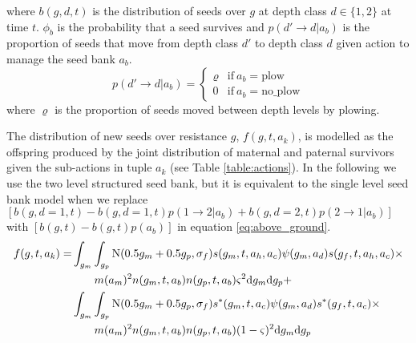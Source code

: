 \documentclass[12pt, a4paper]{article}
\begin{document}
where $b(g, d, t)$ is the distribution of seeds over $g$ at depth class $d \in \{1, 2\}$ at time $t$. $\phi_b$ is the probability that a seed survives and $p(d' \rightarrow d|a_b)$ is the proportion of seeds that move from depth class $d'$ to depth class $d$ given action to manage the seed bank $a_b$.    
\begin{equation}
	p(d' \rightarrow d|a_b) = \begin{cases}
		\varrho &\text{if}~a_b = \text{plow} \\
		0 &\text{if}~a_b = \text{no\_plow}
	\end{cases}
\end{equation}  
where $\varrho$ is the proportion of seeds moved between depth levels by plowing. 
   
The distribution of new seeds over resistance $g$, $f(g, t, a_k)$, is modelled as the offspring produced by the joint distribution of maternal and paternal survivors given the sub-actions in tuple $a_k$ (see Table \ref{table:actions}). In the following we use the two level structured seed bank, but it is equivalent to the single level seed bank model when we replace $[b(g, d = 1, t) - b(g, d = 1, t)p(1 \rightarrow 2|a_b) + b(g, d = 2, t)p(2 \rightarrow 1|a_b)]$ with $[b(g, t) - b(g, t)p(a_b)]$ in equation \ref{eq:above_ground}.        
\begin{equation}
\label{eq:fecund}
\begin{split}
	f(g, t, a_k) = \displaystyle&\int_{g_m}\int_{g_p} \text{N}(0.5 g_m + 0.5 g_p, \sigma_f)s(g_m, t, a_h, a_c)\psi(g_m,a_d)s(g_f, t, a_h, a_c)\times \\ 
		&~~~~~~m(a_m)^2 n(g_m, t, a_b)n(g_p, t, a_b)\varsigma^2\text{d}g_m\text{d}g_p + \\
		&\int_{g_m}\int_{g_p} \text{N}(0.5 g_m + 0.5 g_p, \sigma_f)s^*(g_m, t, a_c)\psi(g_m,a_d)s^*(g_f, t, a_c)\times \\ 
		&~~~~~~m(a_m)^2 n(g_m, t, a_b)n(g_p, t, a_b)(1 - \varsigma)^2 \text{d}g_m \text{d}g_p 
\end{split}
\end{equation}
\end{document}
